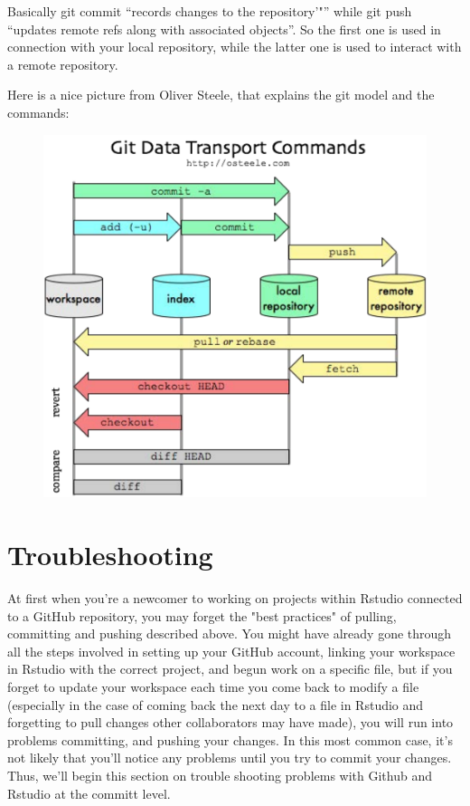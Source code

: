 \documentclass[12pt]{../SOP3_beta}
\begin{document}
\begin{description}
  
Basically git commit ``records changes to the repository'"'' while git push ``updates remote refs along with associated objects''. So the first one is used in connection with your local repository, while the latter one is used to interact with a remote repository.

Here is a nice picture from Oliver Steele, that explains the git model and the commands:  

\begin{figure}
\includegraphics{graphics/MgaV9}
\end{figure}
   
\end{description}

\section{Troubleshooting}

\NP At first when you're a newcomer to working on projects within Rstudio connected to a GitHub repository, you may forget the "best practices" of pulling, committing and pushing described above. You might have already gone through all the steps involved in setting up your GitHub account, linking your workspace in Rstudio with the correct project, and begun work on a specific file, but if you forget to update your workspace each time you come back to modify a file (especially in the case of coming back the next day to a file in Rstudio and forgetting to pull changes other collaborators may have made), you will run into problems committing, and pushing your changes. In this most common case, it's not likely that you'll notice any problems until you try to commit your changes. Thus, we'll begin this section on trouble shooting problems with Github and Rstudio at the committ level.
\end{document}
